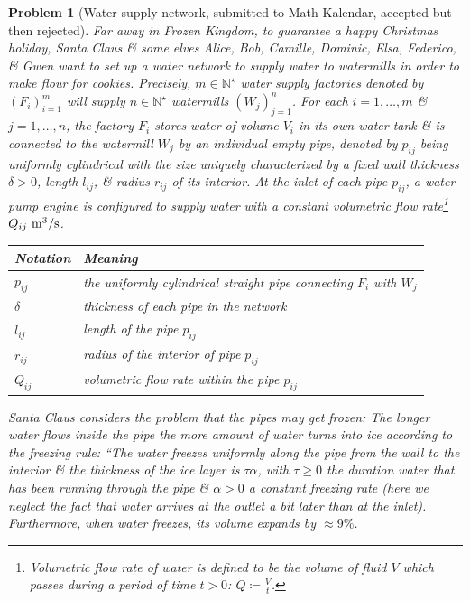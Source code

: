 \documentclass[12pt]{article}
\newtheorem{problem}{Problem}
\begin{document}
\begin{problem}[Water supply network, submitted to Math Kalendar, accepted but then rejected]
	Far away in Frozen Kingdom, to guarantee a happy Christmas holiday, Santa Claus \& some elves Alice, Bob, Camille, Dominic, Elsa, Federico, \& Gwen want to set up a water network to supply water to watermills in order to make flour for cookies. Precisely, $m\in\mathbb{N}^\star$ water supply factories denoted by $(F_i)_{i=1}^m$ will supply $n\in\mathbb{N}^\star$ watermills $(W_j)_{j=1}^n$. For each $i = 1,\ldots,m$ \& $j = 1,\ldots,n$, the factory $F_i$ stores water of volume $V_i$ in its own water tank \& is connected to the watermill $W_j$ by an individual empty pipe, denoted by $p_{ij}$ being uniformly cylindrical with the size uniquely characterized by a fixed wall thickness $\delta > 0$, length $l_{ij}$, \& radius $r_{ij}$ of its interior. At the inlet of each pipe $p_{ij}$, a water pump engine is configured to supply water with a constant \emph{volumetric flow rate}\footnote{{\it Volumetric flow rate} of water is defined to be the volume of fluid $V$ which passes during a period of time $t > 0$: $Q\coloneqq\frac{V}{t}$.} $Q_{ij}\ {\rm m}^3{\tt/}{\rm s}$.
	\begin{table}[H]
		\centering
		\begin{tabular}{|l|l|}
			\hline
			Notation & Meaning \\
			\hline
			$p_{ij}$ & the uniformly cylindrical straight pipe connecting $F_i$ with $W_j$ \\
			\hline
			$\delta$ & thickness of each pipe in the network \\
			\hline
			$l_{ij}$ & length of the pipe $p_{ij}$ \\
			\hline
			$r_{ij}$ & radius of the interior of pipe $p_{ij}$ \\
			\hline
			$Q_{ij}$ & volumetric ﬂow rate within the pipe $p_{ij}$ \\
			\hline
		\end{tabular}
	\end{table}
	Santa Claus considers the problem that the pipes may get frozen: The longer water flows inside the pipe the more amount of water turns into ice according to the \emph{freezing rule}: ``The water freezes uniformly along the pipe from the wall to the interior \& the thickness of the ice layer is $\tau\alpha$, with $\tau\ge0$ the duration water that has been running through the pipe \& $\alpha > 0$ a constant freezing rate (here we neglect the fact that water arrives at the outlet a bit later than at the inlet). Furthermore, when water freezes, its volume expands by $\approx9\%$.
	

\end{problem}
\end{document}
